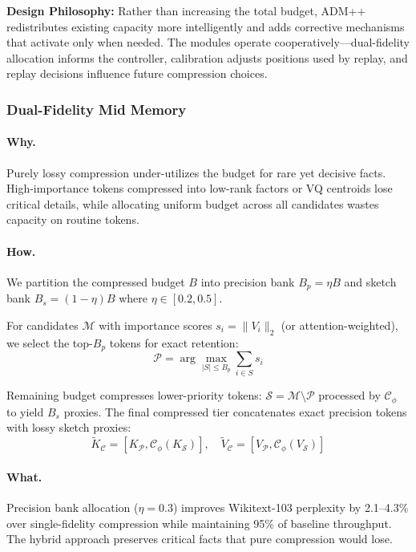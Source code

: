 \documentclass[11pt]{article}
\newcommand{\admpp}{\textsc{ADM++}}
\newcommand{\compressed}{\mathcal{C}}
\begin{document}
\textbf{Design Philosophy:} Rather than increasing the total budget, \admpp{} redistributes existing capacity more intelligently and adds corrective mechanisms that activate only when needed. The modules operate cooperatively---dual-fidelity allocation informs the controller, calibration adjusts positions used by replay, and replay decisions influence future compression choices.

\subsubsection{Dual-Fidelity Mid Memory}
\paragraph{Why.}
Purely lossy compression under-utilizes the budget for rare yet decisive facts. High-importance tokens compressed into low-rank factors or VQ centroids lose critical details, while allocating uniform budget across all candidates wastes capacity on routine tokens.

\paragraph{How.}
We partition the compressed budget $B$ into precision bank $B_p = \eta B$ and sketch bank $B_s = (1-\eta) B$ where $\eta \in [0.2, 0.5]$. 

For candidates $\mathcal{M}$ with importance scores $s_i = \|V_i\|_2$ (or attention-weighted), we select the top-$B_p$ tokens for exact retention:
\[
  \mathcal{P} = \arg\max_{|S| \leq B_p} \sum_{i \in S} s_i
\]

Remaining budget compresses lower-priority tokens: $\mathcal{S} = \mathcal{M} \setminus \mathcal{P}$ processed by $\mathcal{C}_\phi$ to yield $B_s$ proxies. The final compressed tier concatenates exact precision tokens with lossy sketch proxies:
\[
  \tilde K_{\compressed} = [K_{\mathcal{P}}, \mathcal{C}_\phi(K_{\mathcal{S}})], \quad \tilde V_{\compressed} = [V_{\mathcal{P}}, \mathcal{C}_\phi(V_{\mathcal{S}})]
\]

\paragraph{What.}
Precision bank allocation ($\eta = 0.3$) improves Wikitext-103 perplexity by 2.1--4.3\% over single-fidelity compression while maintaining 95\% of baseline throughput. The hybrid approach preserves critical facts that pure compression would lose.
\end{document}
